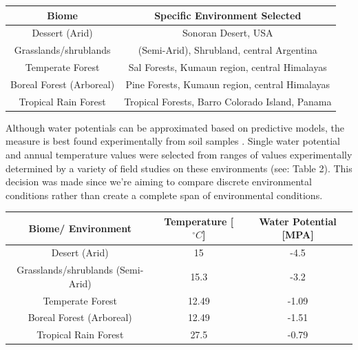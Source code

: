 \documentclass[12pt]{article}
\begin{document}
\begin{savenotes}
	\begin{table}[H]
		\begin{center}
			\begin{tabular}{|c c|} 
				\hline
				Biome & Specific Environment Selected \\ [0.5ex] 
				\hline\hline
				Dessert (Arid) & Sonoran Desert, USA \\ 
				\hline
				Grasslands/shrublands & (Semi-Arid), Shrubland, central Argentina\\
				\hline
				Temperate Forest & Sal Forests, Kumaun region, central Himalayas\\
				\hline
				Boreal Forest (Arboreal) & Pine Forests, Kumaun region, central Himalayas\\
				\hline
				Tropical Rain Forest & Tropical Forests, Barro Colorado Island, Panama \\
				\hline
			\end{tabular}
			\vspace*{-3ex}
			\label{table1}
		\end{center}
	\end{table}
\end{savenotes}

Although water potentials can be approximated based on predictive models, the measure is best found experimentally from soil samples \cite{Abkenar2019}. Single water potential and annual temperature values were selected from ranges of values experimentally determined by a variety of field studies on these environments (see: Table 2). This decision was made since we're aiming to compare discrete environmental conditions rather than create a complete span of environmental conditions.

\begin{table}[H]
	\begin{center}
		\begin{tabular}{|c c c|} 
			\hline
			Biome/ Environment & Temperature [$^{\circ}C$] & Water Potential [MPA]\\ [0.5ex] 
			\hline\hline
			Desert (Arid) & 15 & -4.5 \\ 
			\hline
			Grasslands/shrublands (Semi-Arid) &15.3 & -3.2\\
			\hline
			Temperate Forest & 12.49 & -1.09 \\
			\hline
			Boreal Forest (Arboreal)& 12.49 &  -1.51 \\
			\hline
			Tropical Rain Forest & 27.5 & -0.79 \\
			\hline
		\end{tabular}
		\vspace*{-3ex}
		\label{table2}
	\end{center}
\end{table}
\end{document}
